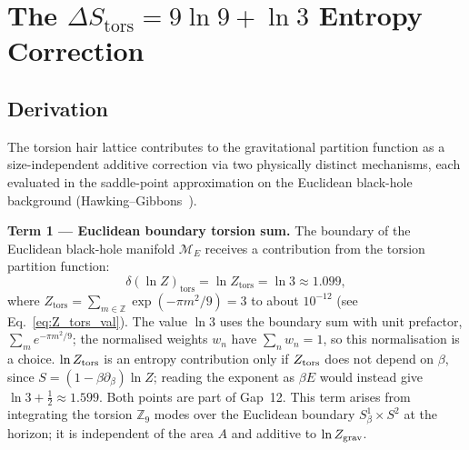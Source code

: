 \documentclass[11pt,a4paper]{article}
\begin{document}
\section{The $\Delta S_{\mathrm{tors}} = 9\ln 9 + \ln 3$ Entropy Correction}
\label{sec:entropy}

\subsection{Derivation}

The torsion hair lattice contributes to the gravitational partition function as
a size-independent additive correction via two physically distinct mechanisms,
each evaluated in the saddle-point approximation on the Euclidean black-hole
background (Hawking--Gibbons~\cite{GibbonsHawking1977}).

\textbf{Term 1 — Euclidean boundary torsion sum.}
The boundary of the Euclidean black-hole manifold $\mathcal{M}_E$ receives a
contribution from the torsion partition function:
\begin{equation}
  \delta(\ln Z)_{\mathrm{tors}} = \ln Z_{\mathrm{tors}} = \ln 3 \approx 1.099,
  \label{eq:lnZ_tors}
\end{equation}
where $Z_{\mathrm{tors}} = \sum_{m\in\mathbb{Z}} \exp(-\pi m^2/9) = 3$ to about $10^{-12}$
(see Eq.~\eqref{eq:Z_tors_val}).  The value $\ln 3$ uses the boundary sum with unit prefactor,
$\sum_m e^{-\pi m^2/9}$; the normalised weights $w_n$ have $\sum_n w_n = 1$, so this
normalisation is a choice. $\ln Z_{\rm tors}$ is an entropy contribution only if $Z_{\rm tors}$
does not depend on $\beta$, since $S = (1-\beta\partial_\beta)\ln Z$; reading the exponent as
$\beta E$ would instead give $\ln 3 + \tfrac12 \approx 1.599$. Both points are part of Gap~12.
This term arises from integrating the torsion
$\mathbb{Z}_9$ modes over the Euclidean boundary $S^1_\beta \times S^2$ at
the horizon; it is independent of the area $A$ and additive to $\ln Z_{\rm grav}$.
\end{document}
